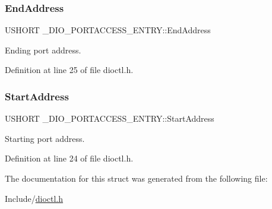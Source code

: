 \subsubsection{\texorpdfstring{EndAddress}{EndAddress}}
{\footnotesize\ttfamily U\+S\+H\+O\+RT \+\_\+\+D\+I\+O\+\_\+\+P\+O\+R\+T\+A\+C\+C\+E\+S\+S\+\_\+\+E\+N\+T\+R\+Y\+::\+End\+Address}



Ending port address. 



Definition at line 25 of file dioctl.\+h.

\mbox{\label{struct___d_i_o___p_o_r_t_a_c_c_e_s_s___e_n_t_r_y_a3ae3afb8f25d173ff0f76d23c0798469}} 
\subsubsection{\texorpdfstring{StartAddress}{StartAddress}}
{\footnotesize\ttfamily U\+S\+H\+O\+RT \+\_\+\+D\+I\+O\+\_\+\+P\+O\+R\+T\+A\+C\+C\+E\+S\+S\+\_\+\+E\+N\+T\+R\+Y\+::\+Start\+Address}



Starting port address. 



Definition at line 24 of file dioctl.\+h.



The documentation for this struct was generated from the following file\+:\begin{DoxyCompactItemize}
\item 
Include/\mbox{\hyperlink{dioctl_8h}{dioctl.\+h}}\end{DoxyCompactItemize}
